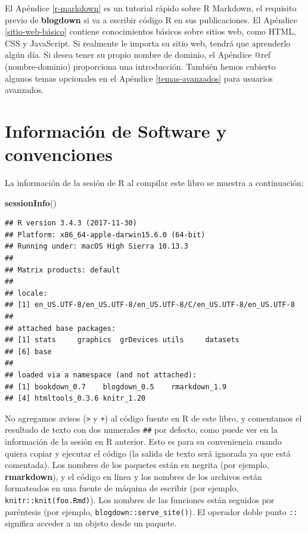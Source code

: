 \documentclass[12pt,]{krantz}
\makeatletter
\newenvironment{Shaded}{\begin{snugshade}}{\end{snugshade}}
\newcommand{\KeywordTok}[1]{\textcolor[rgb]{0.13,0.29,0.53}{\textbf{#1}}}
\newcommand{\NormalTok}[1]{#1}
\newenvironment{kframe}{%
\medskip{}
\setlength{\fboxsep}{.8em}
 \def\at@end@of@kframe{}%
 \ifinner\ifhmode%
  \def\at@end@of@kframe{\end{minipage}}%
  \begin{minipage}{\columnwidth}%
 \fi\fi%
 \def\FrameCommand##1{\hskip\@totalleftmargin \hskip-\fboxsep
 \colorbox{shadecolor}{##1}\hskip-\fboxsep
     \hskip-\linewidth \hskip-\@totalleftmargin \hskip\columnwidth}%
 \MakeFramed {\advance\hsize-\width
   \@totalleftmargin\z@ \linewidth\hsize
   \@setminipage}}%
 {\par\unskip\endMakeFramed%
 \at@end@of@kframe}
\renewenvironment{Shaded}{\begin{kframe}}{\end{kframe}}
\theoremstyle{definition}
\theoremstyle{definition}
\theoremstyle{definition}
\theoremstyle{remark}
\makeatother
\begin{document}
El Apéndice \ref{r-markdown} es un tutorial rápido sobre R Markdown, el
requisito previo de \textbf{blogdown} si va a escribir código R en sus
publicaciones. El Apéndice \ref{sitio-web-básico} contiene conocimientos
básicos sobre sitios web, como HTML, CSS y JavaScript. Si realmente le
importa su sitio web, tendrá que aprenderlo algún día. Si desea tener su
propio nombre de dominio, el Apéndice @ref (nombre-dominio) proporciona
una introducción. También hemos cubierto algunos temas opcionales en el
Apéndice \ref{temas-avanzados} para usuarios avanzados.

\hypertarget{software-info}{%
\section*{Información de Software y convenciones}\label{software-info}}


La información de la sesión de R al compilar este libro se muestra a
continuación:

\begin{Shaded}
\begin{Highlighting}[]
\KeywordTok{sessionInfo}\NormalTok{()}
\end{Highlighting}
\end{Shaded}

\begin{verbatim}
## R version 3.4.3 (2017-11-30)
## Platform: x86_64-apple-darwin15.6.0 (64-bit)
## Running under: macOS High Sierra 10.13.3
## 
## Matrix products: default
## 
## locale:
## [1] en_US.UTF-8/en_US.UTF-8/en_US.UTF-8/C/en_US.UTF-8/en_US.UTF-8
## 
## attached base packages:
## [1] stats     graphics  grDevices utils     datasets 
## [6] base     
## 
## loaded via a namespace (and not attached):
## [1] bookdown_0.7    blogdown_0.5    rmarkdown_1.9  
## [4] htmltools_0.3.6 knitr_1.20
\end{verbatim}

No agregamos avisos (\texttt{\textgreater{}} y \texttt{+}) al código
fuente en R de este libro, y comentamos el resultado de texto con dos
numerales \texttt{\#\#} por defecto, como puede ver en la información de
la sesión en R anterior. Esto es para su conveniencia cuando quiera
copiar y ejecutar el código (la salida de texto será ignorada ya que
está comentada). Los nombres de los paquetes están en negrita (por
ejemplo, \textbf{rmarkdown}), y el código en línea y los nombres de los
archivos están formateados en una fuente de máquina de escribir (por
ejemplo,
\texttt{knitr::knit(\textquotesingle{}foo.Rmd\textquotesingle{})}). Los
nombres de las funciones están seguidos por paréntesis (por ejemplo,
\texttt{blogdown::serve\_site()}). El operador doble punto \texttt{::}
significa acceder a un objeto desde un paquete.
\end{document}

